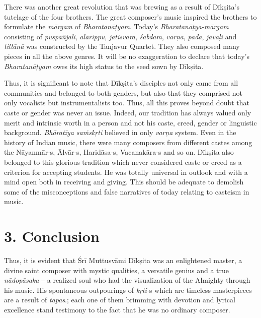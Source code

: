 There was another great revolution that was brewing as a result of Dīkṣita’s tutelage of the four brothers. The great composer’s music inspired the brothers to formulate the \textit{mārgam} of \textit{Bharatanāṭyam}. Today’s \textit{Bharatanāṭya-mārgam} consisting of \textit{puṣpāñjali}, \textit{alārippu}, \textit{jatisvara}, \textit{śabdam}, \textit{varṇa}, \textit{pada}, \textit{jāvaḷi} and \textit{tillānā} was constructed by the Tanjavur Quartet. They also composed many pieces in all the above genres. It will be no exaggeration to declare that today’s \textit{Bharatanāṭyam} owes its high status to the seed sown by Dīkṣita.

\newpage

Thus, it is significant to note that Dīkṣita's disciples not only came from all communities and belonged to both genders, but also that they comprised not only vocalists but instrumentalists too. Thus, all this proves beyond doubt that caste or gender was never an issue. Indeed, our tradition has always valued only merit and intrinsic worth in a person and not his caste, creed, gender or linguistic background. \textit{Bhāratīya saṁskṛti} believed in only \textit{varṇa} system. Even in the history of Indian music, there were many composers from different castes among the Nāyanmār-s, Āḻvār-s, Haridāsa-s, Vacanakāra-s and so on. Dīkṣita also belonged to this glorious tradition which never considered caste or creed as a criterion for accepting students. He was totally universal in outlook and with a mind open both in receiving and giving. This should be adequate to demolish some of the misconceptions and false narratives of today relating to casteism in music.

\vspace{-.3cm}

\section*{3. Conclusion}

Thus, it is evident that Śrī Muttusvāmi Dīkṣita was an enlightened master, a divine saint composer with mystic qualities, a versatile genius and a true \textit{nādopāsaka} – a realized soul who had the visualization of the Almighty through his music. His spontaneous outpourings of \textit{kṛti-}s which are timeless masterpieces are a result of \textit{tapas}.; each one of them brimming with devotion and lyrical excellence stand testimony to the fact that he was no ordinary composer.


